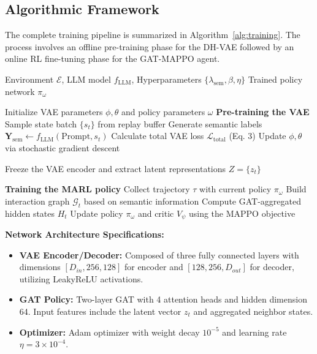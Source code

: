 \documentclass[conference]{IEEEtran}
\begin{document}
\subsection{Algorithmic Framework}

The complete training pipeline is summarized in Algorithm~\ref{alg:training}. The process involves an offline pre-training phase for the DH-VAE followed by an online RL fine-tuning phase for the GAT-MAPPO agent.

\begin{algorithm}[t]
\caption{Training Pipeline of SemGAT-MARL}
\label{alg:training}
\begin{algorithmic}[1]
\REQUIRE 
    Environment $\mathcal{E}$, 
    LLM model $f_{\text{LLM}}$, 
    Hyperparameters $\{\lambda_{\text{sem}}, \beta, \eta\}$
\ENSURE 
    Trained policy network $\pi_\omega$

\STATE Initialize VAE parameters $\phi, \theta$ and policy parameters $\omega$
\STATE \textbf{Pre-training the VAE}
    \STATE Sample state batch $\{s_t\}$ from replay buffer
    \STATE Generate semantic labels $\mathbf{Y}_{\text{sem}} \leftarrow f_{\text{LLM}}(\text{Prompt}, s_t)$
    \STATE Calculate total VAE loss $\mathcal{L}_{\text{total}}$ (Eq. 3)
    \STATE Update $\phi, \theta$ via stochastic gradient descent
\ENDFOR

\STATE Freeze the VAE encoder and extract latent representations $Z = \{z_t\}$

\STATE \textbf{Training the MARL policy}
    \STATE Collect trajectory $\tau$ with current policy $\pi_\omega$
    \STATE Build interaction graph $\mathcal{G}_t$ based on semantic information
    \STATE Compute GAT-aggregated hidden states $H_t$
    \STATE Update policy $\pi_\omega$ and critic $V_\psi$ using the MAPPO objective
\ENDFOR
\end{algorithmic}
\end{algorithm}


\noindent\textbf{Network Architecture Specifications:}
\begin{itemize}
    \item \textbf{VAE Encoder/Decoder:} Composed of three fully connected layers with dimensions $[D_{in}, 256, 128]$ for encoder and $[128, 256, D_{out}]$ for decoder, utilizing LeakyReLU activations.
    \item \textbf{GAT Policy:} Two-layer GAT with 4 attention heads and hidden dimension 64. Input features include the latent vector $z_t$ and aggregated neighbor states.
    \item \textbf{Optimizer:} Adam optimizer with weight decay $10^{-5}$ and learning rate $\eta = 3 \times 10^{-4}$.
\end{itemize}
\end{document}

